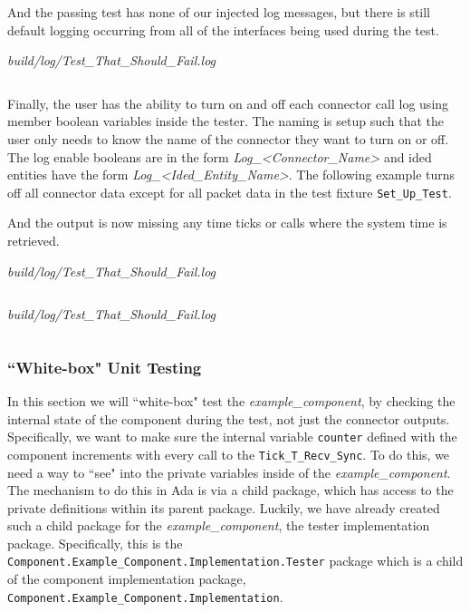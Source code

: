 And the passing test has none of our injected log messages, but there is still default logging occurring from all of the interfaces being used during the test.

\vspace{5mm} %
\textit{build/log/Test\_That\_Should\_Fail.log}
\inputminted{text}{../example_architecture/example_component/test4/build/log/Test_That_Should_Pass.log}
\vspace{5mm} %

Finally, the user has the ability to turn on and off each connector call log using member boolean variables inside the tester. The naming is setup such that the user only needs to know the name of the connector they want to turn on or off. The log enable booleans are in the form \textit{Log\_<Connector\_Name>} and ided entities have the form \textit{Log\_<Ided\_Entity\_Name>}. The following example turns off all connector data except for all packet data in the test fixture \texttt{Set\_Up\_Test}.


And the output is now missing any time ticks or calls where the system time is retrieved.

\vspace{5mm} %
\textit{build/log/Test\_That\_Should\_Fail.log}
\inputminted{text}{../example_architecture/example_component/test5/build/log/Test_That_Should_Fail.log}
\vspace{5mm} %

\vspace{5mm} %
\textit{build/log/Test\_That\_Should\_Fail.log}
\inputminted{text}{../example_architecture/example_component/test5/build/log/Test_That_Should_Pass.log}
\vspace{5mm} %

\subsubsection{``White-box" Unit Testing} \label{White-box Unit Testing Component}

In this section we will ``white-box" test the \textit{example\_component}, by checking the internal state of the component during the test, not just the connector outputs. Specifically, we want to make sure the internal variable \texttt{counter} defined with the component increments with every call to the \texttt{Tick\_T\_Recv\_Sync}. To do this, we need a way to ``see" into the private variables inside of the \textit{example\_component}. The mechanism to do this in Ada is via a child package, which has access to the private definitions within its parent package. Luckily, we have already created such a child package for the \textit{example\_component}, the tester implementation package. Specifically, this is the \texttt{Component.Example\_Component.Implementation.Tester} package which is a child of the component implementation package, \texttt{Component.Example\_Component.Implementation}. \\

